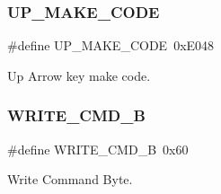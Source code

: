 \hypertarget{group__i8042_gabfc37fa43c153f929cf0c3421979bfc5}{}\label{group__i8042_gabfc37fa43c153f929cf0c3421979bfc5} 
\subsubsection{\texorpdfstring{U\+P\+\_\+\+M\+A\+K\+E\+\_\+\+C\+O\+DE}{UP\_MAKE\_CODE}}
{\footnotesize\ttfamily \#define U\+P\+\_\+\+M\+A\+K\+E\+\_\+\+C\+O\+DE~0x\+E048}



Up Arrow key make code. 

\hypertarget{group__i8042_ga13e4516a13006d3acfd054edaddb8beb}{}\label{group__i8042_ga13e4516a13006d3acfd054edaddb8beb} 
\subsubsection{\texorpdfstring{W\+R\+I\+T\+E\+\_\+\+C\+M\+D\+\_\+B}{WRITE\_CMD\_B}}
{\footnotesize\ttfamily \#define W\+R\+I\+T\+E\+\_\+\+C\+M\+D\+\_\+B~0x60}



Write Command Byte. 

